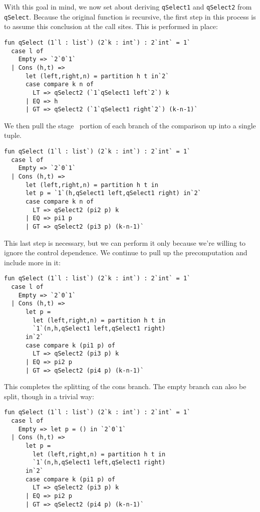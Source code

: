 With this goal in mind, we now set about deriving \texttt{qSelect1} and \texttt{qSelect2} from \texttt{qSelect}.
Because the original function is recursive,
the first step in this process is to assume this conclusion at the call sites.
This is performed in place:
\begin{lstlisting} 
fun qSelect (1`l : list`) (2`k : int`) : 2`int` = 1`
  case l of
    Empty => `2`0`1`
  | Cons (h,t) => 
      let (left,right,n) = partition h t in`2`
      case compare k n of
        LT => qSelect2 (`1`qSelect1 left`2`) k
      | EQ => h
      | GT => qSelect2 (`1`qSelect1 right`2`) (k-n-1)`
\end{lstlisting}
We then pull the stage \bbone\ portion of each branch of the comparison up into a single tuple.
\begin{lstlisting} 
fun qSelect (1`l : list`) (2`k : int`) : 2`int` = 1`
  case l of
    Empty => `2`0`1`
  | Cons (h,t) => 
      let (left,right,n) = partition h t in
      let p = `1`(h,qSelect1 left,qSelect1 right) in`2`
      case compare k n of
        LT => qSelect2 (pi2 p) k
      | EQ => pi1 p
      | GT => qSelect2 (pi3 p) (k-n-1)`
\end{lstlisting}
This last step is necessary, but we can perform it only because we're willing to ignore the control dependence.
We continue to pull up the precomputation and include more in it:

\begin{lstlisting} 
fun qSelect (1`l : list`) (2`k : int`) : 2`int` = 1`
  case l of
    Empty => `2`0`1`
  | Cons (h,t) => 
      let p =
        let (left,right,n) = partition h t in
        `1`(n,h,qSelect1 left,qSelect1 right)
      in`2`
      case compare k (pi1 p) of
        LT => qSelect2 (pi3 p) k
      | EQ => pi2 p
      | GT => qSelect2 (pi4 p) (k-n-1)`
\end{lstlisting}

This completes the splitting of the cons branch.  
The empty branch can also be split, though in a trivial way:

\begin{lstlisting} 
fun qSelect (1`l : list`) (2`k : int`) : 2`int` = 1`
  case l of
    Empty => let p = () in `2`0`1`
  | Cons (h,t) => 
      let p =
        let (left,right,n) = partition h t in
        `1`(n,h,qSelect1 left,qSelect1 right)
      in`2`
      case compare k (pi1 p) of
        LT => qSelect2 (pi3 p) k
      | EQ => pi2 p
      | GT => qSelect2 (pi4 p) (k-n-1)`
\end{lstlisting}

